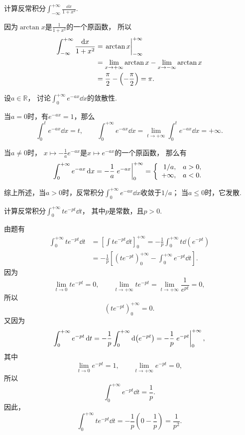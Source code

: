 \begin{example}
计算反常积分\(\int_{-\infty}^{+\infty} \frac{\dd{x}}{1+x^2}\).
\begin{solution}
因为\(\arctan x\)是\(\frac{1}{1+x^2}\)的一个原函数，
所以\begin{align*}
	\int_{-\infty}^{+\infty} \frac{\dd{x}}{1+x^2}
	&= \eval{\arctan x}_{-\infty}^{+\infty} \\
	&= \lim_{x\to+\infty} \arctan x
		-\lim_{x\to-\infty} \arctan x \\
	&= \frac{\pi}{2} - \left(-\frac{\pi}{2}\right)
	= \pi.
\end{align*}
\end{solution}
\end{example}

\begin{example}
设\(a\in\mathbb{R}\)，
讨论\(\int_0^{+\infty} e^{-ax} \dd{x}\)的敛散性.
\begin{solution}
当\(a=0\)时，有\(e^{-ax} = 1\)，那么\[
	\int_0^t e^{-ax} \dd{x} = t,
	\qquad
	\int_0^{+\infty} e^{-ax} \dd{x}
	= \lim_{t\to+\infty} \int_0^t e^{-ax} \dd{x}
	= +\infty.
\]

当\(a\neq0\)时，
\(x \mapsto -\frac1a e^{-ax}\)是\(x \mapsto e^{-ax}\)的一个原函数，
那么有\[
	\int_0^{+\infty} e^{-ax} \dd{x}
	= -\frac1a \eval{e^{-ax}}_0^{+\infty}
	= \left\{ \begin{array}{rl}
		1/a, & a>0, \\
		+\infty, & a < 0.
	\end{array} \right.
\]

综上所述，当\(a>0\)时，反常积分\(\int_0^{+\infty} e^{-ax} \dd{x}\)收敛于\(1/a\)；
当\(a\leq0\)时，它发散.
\end{solution}
\end{example}

\begin{example}
计算反常积分\(\int_0^{+\infty} t e^{-pt} \dd{t}\)，
其中\(p\)是常数，且\(p>0\).
\begin{solution}
由题有\begin{align*}
	\int_0^{+\infty} t e^{-pt} \dd{t}
	&= \left[ \int t e^{-pt} \dd{t} \right]_0^{+\infty}
	= -\frac{1}{p} \int_0^{+\infty} t \dd(e^{-pt}) \\
	&= -\frac{1}{p} \left[
			\left( t e^{-pt} \right)_0^{+\infty}
			- \int_0^{+\infty} e^{-pt} \dd{t}
		\right].
\end{align*}
因为\[
	\lim_{t\to0} t e^{-pt} = 0, \qquad
	\lim_{t\to+\infty} t e^{-pt}
	= \lim_{t\to+\infty} \frac{1}{e^{pt}}
	= 0,
\]
所以\[
	\left( t e^{-pt} \right)_0^{+\infty}
	= 0.
\]
又因为\[
	\int_0^{+\infty} e^{-pt} \dd{t}
	= -\frac{1}{p} \int_0^{+\infty} \dd(e^{-pt})
	= -\frac{1}{p} \eval{e^{-pt}}_0^{+\infty},
\]
其中\[
	\lim_{t\to0} e^{-pt} = 1, \qquad
	\lim_{t\to+\infty} e^{-pt} = 0,
\]
所以\[
	\int_0^{+\infty} e^{-pt} \dd{t}
	= \frac{1}{p}.
\]
因此，\[
	\int_0^{+\infty} t e^{-pt} \dd{t}
	= -\frac{1}{p} \left(
			0 - \frac{1}{p}
		\right)
	= \frac{1}{p^2}.
\]
\end{solution}
\end{example}

